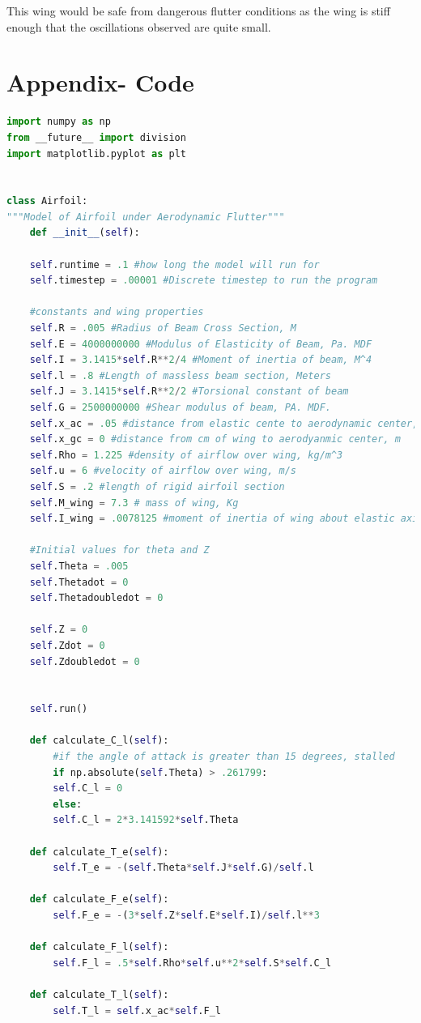 \documentclass[]{article}
\begin{document}
This wing would be safe from dangerous flutter conditions as the wing is stiff enough that the oscillations observed are quite small. 

\section{Appendix- Code}

\begin{lstlisting}[language=python]
import numpy as np
from __future__ import division
import matplotlib.pyplot as plt


class Airfoil:
"""Model of Airfoil under Aerodynamic Flutter"""
	def __init__(self):
	
	self.runtime = .1 #how long the model will run for
	self.timestep = .00001 #Discrete timestep to run the program
	
	#constants and wing properties
	self.R = .005 #Radius of Beam Cross Section, M
	self.E = 4000000000 #Modulus of Elasticity of Beam, Pa. MDF
	self.I = 3.1415*self.R**2/4 #Moment of inertia of beam, M^4
	self.l = .8 #Length of massless beam section, Meters
	self.J = 3.1415*self.R**2/2 #Torsional constant of beam
	self.G = 2500000000 #Shear modulus of beam, PA. MDF.
	self.x_ac = .05 #distance from elastic cente to aerodynamic center,m
	self.x_gc = 0 #distance from cm of wing to aerodyanmic center, m
	self.Rho = 1.225 #density of airflow over wing, kg/m^3
	self.u = 6 #velocity of airflow over wing, m/s
	self.S = .2 #length of rigid airfoil section
	self.M_wing = 7.3 # mass of wing, Kg
	self.I_wing = .0078125 #moment of inertia of wing about elastic axis,kg*m^2
	
	#Initial values for theta and Z
	self.Theta = .005
	self.Thetadot = 0
	self.Thetadoubledot = 0
	
	self.Z = 0
	self.Zdot = 0
	self.Zdoubledot = 0
	
	
	self.run()
	
	def calculate_C_l(self):
		#if the angle of attack is greater than 15 degrees, stalled
		if np.absolute(self.Theta) > .261799:
		self.C_l = 0
		else:
		self.C_l = 2*3.141592*self.Theta
	
	def calculate_T_e(self):
		self.T_e = -(self.Theta*self.J*self.G)/self.l
	
	def calculate_F_e(self):
		self.F_e = -(3*self.Z*self.E*self.I)/self.l**3
	
	def calculate_F_l(self):
		self.F_l = .5*self.Rho*self.u**2*self.S*self.C_l
	
	def calculate_T_l(self):
		self.T_l = self.x_ac*self.F_l
	

\end{lstlisting}
\end{document}
